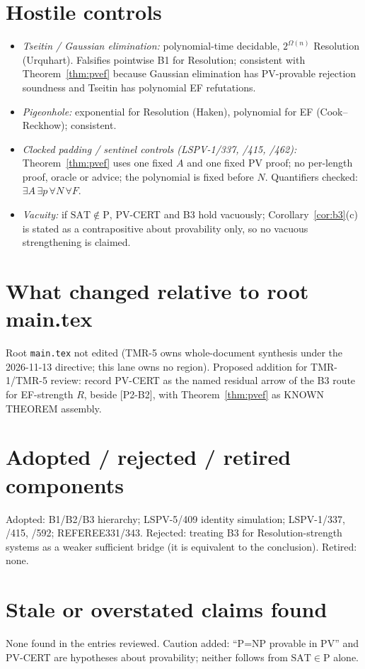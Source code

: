 \documentclass[11pt]{article}
\theoremstyle{remark}
\newcommand{\SAT}{\mathrm{SAT}}
\begin{document}
\section{Hostile controls}
\begin{itemize}
\item \emph{Tseitin / Gaussian elimination:} polynomial-time decidable, $2^{\Omega(n)}$ Resolution
 (Urquhart). Falsifies pointwise B1 for Resolution; consistent with Theorem~\ref{thm:pvef} because
 Gaussian elimination has PV-provable rejection soundness and Tseitin has polynomial EF refutations.
\item \emph{Pigeonhole:} exponential for Resolution (Haken), polynomial for EF (Cook--Reckhow);
 consistent.
\item \emph{Clocked padding / sentinel controls (LSPV-1/337, /415, /462):} Theorem~\ref{thm:pvef} uses
 one fixed $A$ and one fixed PV proof; no per-length proof, oracle or advice; the polynomial is fixed
 before $N$. Quantifiers checked: $\exists A\,\exists p\,\forall N\,\forall F$.
\item \emph{Vacuity:} if $\SAT\notin\mathrm P$, PV-CERT and B3 hold vacuously; Corollary~\ref{cor:b3}(c)
 is stated as a contrapositive about provability only, so no vacuous strengthening is claimed.
\end{itemize}

\section{What changed relative to root main.tex}
Root \texttt{main.tex} not edited (TMR-5 owns whole-document synthesis under the 2026-11-13 directive;
this lane owns no region). Proposed addition for TMR-1/TMR-5 review: record PV-CERT as the named
residual arrow of the B3 route for EF-strength $R$, beside [P2-B2], with Theorem~\ref{thm:pvef} as
KNOWN THEOREM assembly.

\section{Adopted / rejected / retired components}
Adopted: B1/B2/B3 hierarchy; LSPV-5/409 identity simulation; LSPV-1/337, /415, /592; REFEREE331/343.
Rejected: treating B3 for Resolution-strength systems as a weaker sufficient bridge (it is equivalent
to the conclusion). Retired: none.

\section{Stale or overstated claims found}
None found in the entries reviewed. Caution added: ``P=NP provable in PV'' and PV-CERT are
hypotheses about provability; neither follows from $\SAT\in\mathrm P$ alone.
\end{document}
